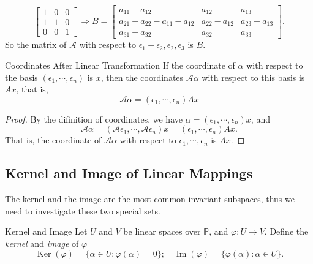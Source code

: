 \begin{solution}
\begin{equation}
\begin{bmatrix}
      1 & 0 & 0\\
      1 & 1 & 0\\
      0 & 0 & 1
    \end{bmatrix}
    \Rightarrow
    B =
    \begin{bmatrix}
      a_{11} + a_{12} & a_{12} & a_{13}\\
      a_{21} + a_{22} - a_{11} - a_{12} & a_{22} - a_{12} & a_{23} - a_{13}\\
      a_{31} + a_{32} & a_{32} & a_{33}
    \end{bmatrix}.
  \end{equation}
  So the matrix of $\mathcal{A}$ with respect to $\epsilon_1 + \epsilon_2,
  \epsilon_2, \epsilon_3$ is $B$.
\end{solution}

\begin{proposition}{Coordinates After Linear Transformation}{}
  If the coordinate of $\alpha$ with respect to the basis
  $(\epsilon_1,\cdots,\epsilon_n)$ is $x$,
  then the coordinates $\mathcal{A}\alpha$ with respect to this basis is $Ax$,
  that is,
  \begin{equation}
    \mathcal{A}\alpha = (\epsilon_1,\cdots,\epsilon_n)Ax
  \end{equation}
\end{proposition}

\begin{proof}
  By the difinition of coordinates, we have $\alpha =
  (\epsilon_1,\cdots,\epsilon_n)x$,
  and
  \begin{equation}
    \mathcal{A}\alpha = (\mathcal{A}\epsilon_1,\cdots,\mathcal{A}\epsilon_n)x = (\epsilon_1,\cdots,\epsilon_n)Ax.
  \end{equation}
  That is, the coordinate of $\mathcal{A}\alpha$ with respect to
  $\epsilon_1,\cdots,\epsilon_n$ is $Ax$.
\end{proof}

\subsection{Kernel and Image of Linear Mappings}

The kernel and the image are the most common invariant subspaces,
thus we need to investigate these two special sets.

\begin{definition}{Kernel and Image}{}
  Let $U$ and $V$ be linear spaces over $\mathbb{P}$,
  and $\varphi: U \rightarrow V$.
  Define the \emph{kernel} and \emph{image} of $\varphi$
  \begin{equation}
    \operatorname{Ker} (\varphi) = \{\alpha \in U: \varphi (\alpha) = 0\}; \quad
    \operatorname{Im} (\varphi) = \{\varphi (\alpha) : \alpha \in U\}.
  \end{equation}
\end{definition}

